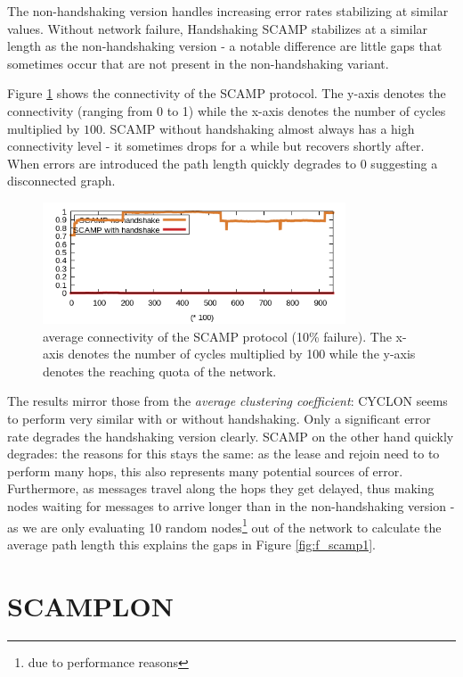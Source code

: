 \documentclass[11pt, english, screen]{report-rd-info}
\begin{document}
The non-handshaking version handles increasing error rates stabilizing at similar values.
Without network failure, Handshaking SCAMP stabilizes at a similar length as the non-handshaking version - a notable difference are little gaps that sometimes occur that are not present in the non-handshaking variant.


Figure \ref{fig:f_scamp3} shows the connectivity of the SCAMP protocol.
The y-axis denotes the connectivity (ranging from 0 to 1) while the x-axis denotes the number of cycles multiplied by $100$.
SCAMP without handshaking almost always has a high connectivity level - it sometimes drops for a while but recovers shortly after.
When errors are introduced the path length quickly degrades to $0$ suggesting a disconnected graph.

\begin{figure}[H]
    \centering
    \includegraphics[width=9cm]{Images/statistics/scamp_1000_c2/avgpath/con_10}
    \caption{average connectivity of the SCAMP protocol (10\% failure). The x-axis denotes the number of cycles multiplied by 100 while the y-axis denotes the reaching quota of the network.}
    \label{fig:f_scamp3}
\end{figure}


The results mirror those from the \emph{average clustering coefficient}: CYCLON seems to perform very similar with or without handshaking.
Only a significant error rate degrades the handshaking version clearly.
SCAMP on the other hand quickly degrades: the reasons for this stays the same: as the lease and rejoin need to to perform many hops, this also represents many potential sources of error.
Furthermore, as messages travel along the hops they get delayed, thus making nodes waiting for messages to arrive longer than in the non-handshaking version - as we are only evaluating 10 random nodes\footnote{due to performance reasons} out of the network to calculate the average path length this explains the gaps in Figure \ref{fig:f_scamp1}.

\section{SCAMPLON}
\end{document}

